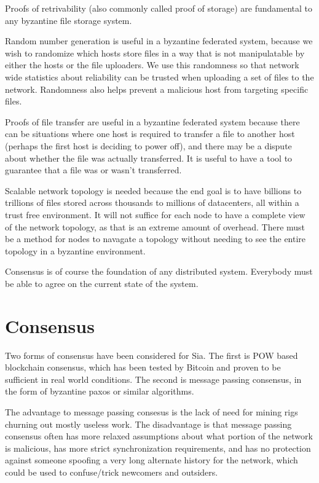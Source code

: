 \documentclass[twocolumn]{article}
\begin{document}
Proofs of retrivability (also commonly called proof of storage) are fundamental to any byzantine file storage system.

Random number generation is useful in a byzantine federated system, because we wish to randomize which hosts store files in a way that is not manipulatable by either the hosts or the file uploaders.
We use this randomness so that network wide statistics about reliability can be trusted when uploading a set of files to the network.
Randomness also helps prevent a malicious host from targeting specific files.

Proofs of file transfer are useful in a byzantine federated system because there can be situations where one host is required to transfer a file to another host (perhaps the first host is deciding to power off), and there may be a dispute about whether the file was actually transferred.
It is useful to have a tool to guarantee that a file was or wasn't transferred.

Scalable network topology is needed because the end goal is to have billions to trillions of files stored across thousands to millions of datacenters, all within a trust free environment.
It will not suffice for each node to have a complete view of the network topology, as that is an extreme amount of overhead.
There must be a method for nodes to navagate a topology without needing to see the entire topology in a byzantine environment.

Consensus is of course the foundation of any distributed system.
Everybody must be able to agree on the current state of the system.

\section{Consensus}
Two forms of consensus have been considered for Sia.
The first is POW based blockchain consensus, which has been tested by Bitcoin and proven to be sufficient in real world conditions.
The second is message passing consensus, in the form of byzantine paxos or similar algorithms.

The advantage to message passing consesus is the lack of need for mining rigs churning out mostly useless work.
The disadvantage is that message passing consensus often has more relaxed assumptions about what portion of the network is malicious, has more strict synchronization requirements, and has no protection against someone spoofing a very long alternate history for the network, which could be used to confuse/trick newcomers and outsiders.
\end{document}
